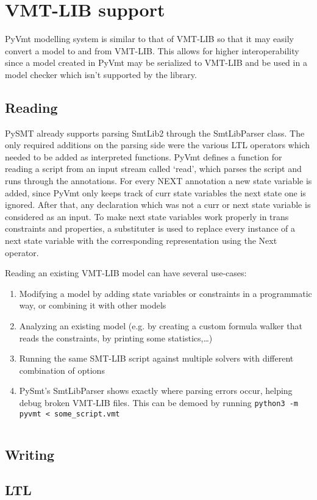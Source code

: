 \chapter{VMT-LIB support}
PyVmt modelling system is similar to that of VMT-LIB so that it may easily convert a model to and from VMT-LIB.
This allows for higher interoperability since a model created in PyVmt may be serialized to VMT-LIB and be used in a model checker which isn't supported by the library.

\section{Reading}
PySMT already supports parsing SmtLib2 through the SmtLibParser class.
The only required additions on the parsing side were the various LTL operators which needed to be added as interpreted functions.
PyVmt defines a function for reading a script from an input stream called `read', which parses the script and runs through the annotations.
For every NEXT annotation a new state variable is added, since PyVmt only keeps track of curr state variables the next state one is ignored.
After that, any declaration which was not a curr or next state variable is considered as an input.
To make next state variables work properly in trans constraints and properties, a substituter is used to replace every instance of a next state variable with the corresponding representation using the Next operator.

Reading an existing VMT-LIB model can have several use-cases:
\begin{enumerate}
    \item Modifying a model by adding state variables or constraints in a programmatic way, or combining it with other models
    \item Analyzing an existing model (e.g. by creating a custom formula walker that reads the constraints, by printing some statistics,\dots)
    \item Running the same SMT-LIB script against multiple solvers with different combination of options
    \item PySmt's SmtLibParser shows exactly where parsing errors occur, helping debug broken VMT-LIB files. This can be demoed by running \texttt{python3 -m pyvmt < some_script.vmt}
\end{enumerate}
\inputminted[firstline=10, lastline=33]{python3}{py/vmtlib_support.py}

\section{Writing}



\section{LTL}
